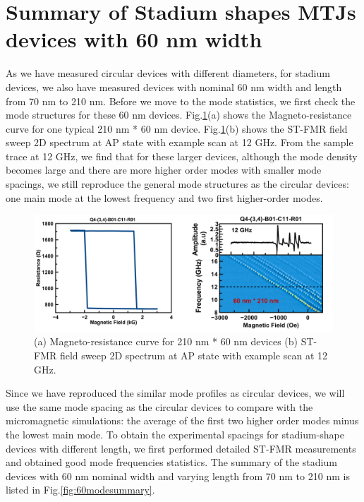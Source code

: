 \clearpage

\section{Summary of Stadium shapes MTJs devices with 60 nm width}

As we have measured circular devices with different diameters, for stadium devices, we also have measured devices with nominal 60 nm width and length from 70 nm to 210 nm. Before we move to the mode statistics, we first check the mode structures for these 60 nm devices. Fig.\ref{fig:210nmdata}(a) shows the Magneto-resistance curve for one typical 210 nm * 60 nm device. Fig.\ref{fig:210nmdata}(b) shows the ST-FMR field sweep 2D spectrum at AP state with example scan at 12 GHz. From the sample trace at 12 GHz, we find that for these larger devices, although the mode density becomes large and there are more higher order modes with smaller mode spacings, we still reproduce the general mode structures as the circular devices: one main mode at the lowest frequency and two first higher-order modes.  


\begin{figure}[!ht]
  \centering
  \includegraphics[width=1.0\textwidth]{fig/stadium/210nmdata}
   \caption{(a) Magneto-resistance curve for 210 nm * 60 nm devices (b) ST-FMR field sweep 2D spectrum at AP state with example scan at 12 GHz.}
  \label{fig:210nmdata}
\end{figure}

Since we have reproduced the similar mode profiles as circular devices, we will use the same mode spacing as the circular devices to compare with the micromagnetic simulations: the average of the first two higher order modes minus the lowest main mode. To obtain the experimental spacings for stadium-shape devices with different length, we first performed detailed ST-FMR measurements and obtained good mode frequencies statistics. The summary of the stadium devices with 60 nm nominal width and varying length from 70 nm to 210 nm is listed in Fig.\ref{fig:60modesummary}.


